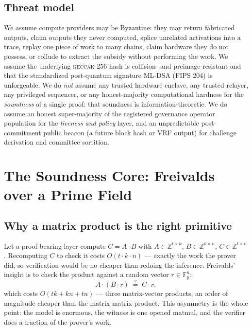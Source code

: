 \documentclass[11pt,a4paper]{article}
\begin{document}
\subsection{Threat model}\label{sec:threat}

We assume compute providers may be Byzantine: they may return fabricated outputs, claim outputs they never computed, splice unrelated activations into a trace, replay one piece of work to many chains, claim hardware they do not possess, or collude to extract the subsidy without performing the work. We assume the underlying \textsc{keccak}-256 hash is collision- and preimage-resistant and that the standardized post-quantum signature ML-DSA (FIPS 204) is unforgeable. We do \emph{not} assume any trusted hardware enclave, any trusted relayer, any privileged sequencer, or any honest-majority computational hardness for the \emph{soundness} of a single proof: that soundness is information-theoretic. We do assume an honest super-majority of the registered governance operator population for the \emph{liveness and policy} layer, and an unpredictable post-commitment public beacon (a future block hash or VRF output) for challenge derivation and committee sortition.

\section{The Soundness Core: Freivalds over a Prime Field}\label{sec:soundness}

\subsection{Why a matrix product is the right primitive}

Let a proof-bearing layer compute $C = A \cdot B$ with $A \in \mathbb{Z}^{t \times k}$, $B \in \mathbb{Z}^{k \times n}$, $C \in \mathbb{Z}^{t \times n}$. Recomputing $C$ to check it costs $O(t \cdot k \cdot n)$ --- exactly the work the prover did, so verification would be no cheaper than redoing the inference. Freivalds' insight is to check the product against a random vector $r \in \mathbb{F}_p^{n}$:
\begin{equation}\label{eq:freivalds}
  A \cdot (B \cdot r) \;\overset{?}{=}\; C \cdot r ,
\end{equation}
which costs $O(t k + k n + t n)$ --- three matrix-vector products, an order of magnitude cheaper than the matrix-matrix product. This asymmetry is the whole point: the model is enormous, the witness is one opened matmul, and the verifier does a fraction of the prover's work.
\end{document}
